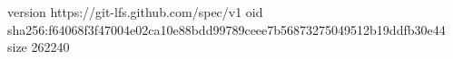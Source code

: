 version https://git-lfs.github.com/spec/v1
oid sha256:f64068f3f47004e02ca10e88bdd99789ceee7b56873275049512b19ddfb30e44
size 262240
